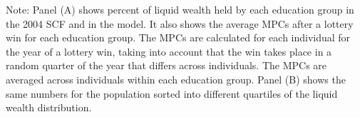 \documentclass[\latexroot/\projectname]{subfiles}
\begin{document}
\begin{table}[tb]
  \noindent\parbox{\textwidth}{
    \medskip
    \footnotesize Note: Panel (A) shows percent of liquid wealth held by each education group in the 2004 SCF and in the model. It also shows the average MPCs after a lottery win for each education group. The MPCs are calculated for each individual for the year of a lottery win, taking into account that the win takes place in a random quarter of the year that differs across individuals. The MPCs are averaged across individuals within each education group. Panel (B) shows the same numbers for the population sorted into different quartiles of the liquid wealth distribution.
  }
\end{table}

\smartbib
\end{document}
